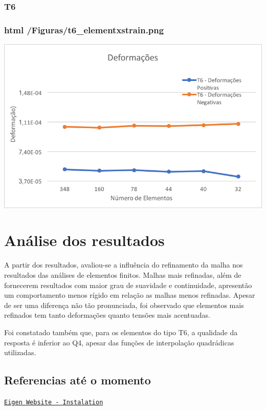 \subsubsection*{T6}

\subsubsection*{html /\+Figuras/t6\+\_\+elementxstrain.png}


\begin{DoxyImageNoCaption}
  \mbox{\includegraphics[width=\textwidth,height=\textheight/2,keepaspectratio=true]{t6_elementxstrain.png}}
\end{DoxyImageNoCaption}
 

\section*{Análise dos resultados}


\begin{DoxyItemize}
\item A partir dos resultados, avaliou-\/se a influência do refinamento da malha nos resultados das análises de elementos finitos. Malhas mais refinadas, além de fornecerem resultados com maior grau de suavidade e continuidade, apresentão um comportamento menos rígido em relação as malhas menos refinadas. Apesar de ser uma diferença não tão pronunciada, foi observado que elementos mais refinados tem tanto deformações quanto tensões mais acentuadas.
\item Foi constatado também que, para os elementos do tipo T6, a qualidade da resposta é inferior ao Q4, apesar das funções de interpolação quadrádicas utilizadas.
\end{DoxyItemize}

\subsection*{Referencias até o momento}

\href{http://eigen.tuxfamily.org/index.php?title=IDEs#Visual_Studio}{\tt Eigen Website -\/ Instalation} 